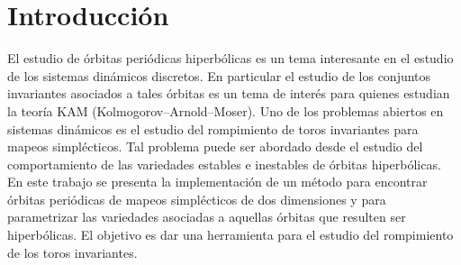 
\chapter{Introducción}

El estudio de órbitas peri\'odicas hiperb\'olicas es un tema interesante en el estudio de los sistemas din\'amicos discretos. En particular el estudio de los conjuntos invariantes asociados a tales \'orbitas es un tema de inter\'es para quienes estudian la teor\'ia KAM (Kolmogorov–Arnold–Moser). Uno de los problemas abiertos en sistemas din\'amicos es el estudio del rompimiento de toros invariantes para mapeos simpl\'ecticos. Tal problema puede ser abordado desde el estudio del comportamiento de las variedades estables e inestables de \'orbitas hiperb\'olicas. \\

En este trabajo se presenta la implementaci\'on de un m\'etodo para encontrar \'orbitas peri\'odicas de mapeos simpl\'ecticos de dos dimensiones y para parametrizar las variedades asociadas a aquellas \'orbitas que resulten ser hiperb\'olicas. El objetivo es dar una herramienta para el estudio del rompimiento de los toros invariantes. 

